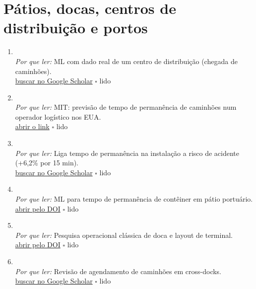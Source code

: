 \section{Pátios, docas, centros de distribuição e portos}
\begin{enumerate}[leftmargin=*]
  \item {}\\
  \textit{Por que ler:} ML com dado real de um centro de distribuição (chegada de caminhões).\\
  \href{https://scholar.google.com/scholar?q=Predictive+analytics+for+truck+arrival+time+estimation\%3A+a+field+study+at+a+European+distribution+centre}{buscar no Google Scholar} \hfill $\square$ \textsf{\small lido}
  \item {}\\
  \textit{Por que ler:} MIT: previsão de tempo de permanência de caminhões num operador logístico nos EUA.\\
  \href{https://dspace.mit.edu/handle/1721.1/126379}{abrir o link} \hfill $\square$ \textsf{\small lido}
  \item {}\\
  \textit{Por que ler:} Liga tempo de permanência na instalação a risco de acidente (+6,2\% por 15 min).\\
  \href{https://scholar.google.com/scholar?q=Estimates+Show+Commercial+Driver+Detention+Increases+Crash+Risks+and+Costs\%2C+but+Current+Data+Limit+Further+Analysis}{buscar no Google Scholar} \hfill $\square$ \textsf{\small lido}
  \item {}\\
  \textit{Por que ler:} ML para tempo de permanência de contêiner em pátio portuário.\\
  \href{https://doi.org/10.1080/03088839.2025.2501010}{abrir pelo DOI} \hfill $\square$ \textsf{\small lido}
  \item {}\\
  \textit{Por que ler:} Pesquisa operacional clássica de doca e layout de terminal.\\
  \href{https://doi.org/10.1287/trsc.33.4.419}{abrir pelo DOI} \hfill $\square$ \textsf{\small lido}
  \item {}\\
  \textit{Por que ler:} Revisão de agendamento de caminhões em cross-docks.\\
  \href{https://scholar.google.com/scholar?q=Cross+dock+scheduling\%3A+classification\%2C+literature+review+and+research+agenda}{buscar no Google Scholar} \hfill $\square$ \textsf{\small lido}

\end{enumerate}
